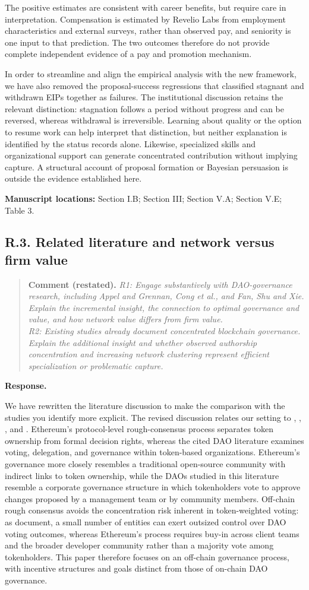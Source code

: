 \documentclass[11pt,letterpaper]{article}
\newcommand{\point}[3]{%
  \Needspace{7\baselineskip}
  \subsection*{#1. #2}\phantomsection\label{pt:#1}%
  \begin{quote}\small\textbf{Comment (restated).} \textit{#3}\end{quote}%
  \textbf{Response.}\enspace\ignorespaces}
\newcommand{\locations}[1]{\par{\small\textbf{Manuscript locations:} #1.}\par}
\begin{document}
The positive estimates are consistent with career benefits, but require care in interpretation. Compensation is estimated by Revelio Labs from employment characteristics and external surveys, rather than observed pay, and seniority is one input to that prediction. The two outcomes therefore do not provide complete independent evidence of a pay and promotion mechanism. 

In order to streamline and align the empirical analysis with the new framework, we have also removed the proposal-success regressions that classified stagnant and withdrawn EIPs together as failures. The institutional discussion retains the relevant distinction: stagnation follows a period without progress and can be reversed, whereas withdrawal is irreversible. Learning about quality or the option to resume work can help interpret that distinction, but neither explanation is identified by the status records alone. Likewise, specialized skills and organizational support can generate concentrated contribution without implying capture. A structural account of proposal formation or Bayesian persuasion is outside the evidence established here.

\locations{Section I.B; Section III; Section V.A; Section V.E; Table 3}

\point{R.3}{Related literature and network versus firm value}{R1: Engage substantively with DAO-governance research, including Appel and Grennan, Cong et al., and Fan, Shu and Xie. Explain the incremental insight, the connection to optimal governance and value, and how network value differs from firm value.\\
R2: Existing studies already document concentrated blockchain governance. Explain the additional insight and whether observed authorship concentration and increasing network clustering represent efficient specialization or problematic capture.}

We have rewritten the literature discussion to make the comparison with the studies you identify more explicit. The revised discussion relates our setting to \citet{AppelGrennan2023,Appel-Grennan2024}, \citet{Cong-et-al2025}, \citet{Fan-et-al2025}, and \citet{Bongaerts-et-al2025}. Ethereum's protocol-level rough-consensus process separates token ownership from formal decision rights, whereas the cited DAO literature examines voting, delegation, and governance within token-based organizations. Ethereum's governance more closely resembles a traditional open-source community with indirect links to token ownership, while the DAOs studied in this literature resemble a corporate governance structure in which tokenholders vote to approve changes proposed by a management team or by community members. Off-chain rough consensus avoids the concentration risk inherent in token-weighted voting: as \citet{AppelGrennan2023,Appel-Grennan2024} document, a small number of entities can exert outsized control over DAO voting outcomes, whereas Ethereum's process requires buy-in across client teams and the broader developer community rather than a majority vote among tokenholders. This paper therefore focuses on an off-chain governance process, with incentive structures and goals distinct from those of on-chain DAO governance.
\end{document}
